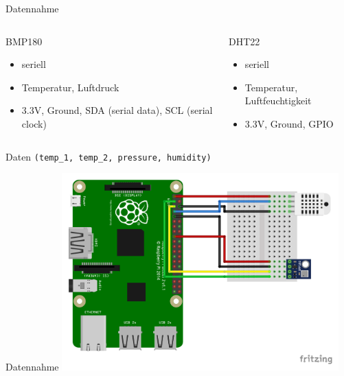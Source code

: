 \begin{frame}[t]{Datennahme}

  \begin{columns}[t,onlytextwidth]
    \begin{column}{0.48\textwidth}
      \begin{block}{BMP180}
        \begin{itemize}
          \item seriell
          \item Temperatur, Luftdruck
          \item 3.3V, Ground, SDA (serial data), SCL (serial clock)
        \end{itemize}
      \end{block}
    \end{column}
    \begin{column}{0.48\textwidth}
      \begin{block}{DHT22}
        \begin{itemize}
          \item seriell
          \item Temperatur, Luftfeuchtigkeit
          \item 3.3V, Ground, GPIO
        \end{itemize}
      \end{block}
    \end{column}
  \end{columns}

  \begin{block}{Daten}
    \centering
    \texttt{(temp\_1, temp\_2, pressure, humidity)}
  \end{block}

\end{frame}

\begin{frame}[c]{Datennahme}
  \centering
  \includegraphics[width=0.8\textwidth]{../weatherstation_rpi2.png}
\end{frame}
